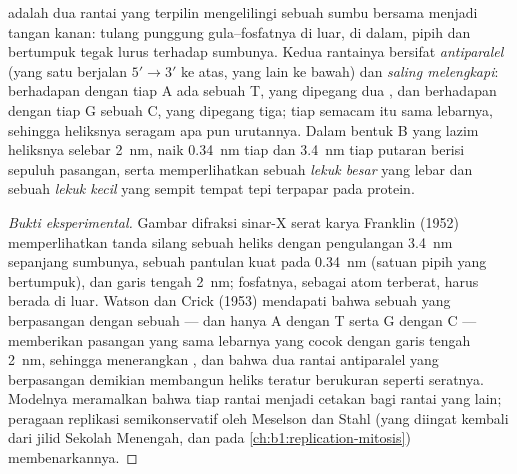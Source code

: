 \begin{theorem}\label{thm:b1:nucleic-acids:helix}
 adalah dua rantai  yang terpilin mengelilingi sebuah
sumbu bersama menjadi \emph{} tangan kanan: tulang punggung
gula--fosfatnya di luar,  di dalam, pipih dan bertumpuk tegak
lurus terhadap sumbunya. Kedua rantainya bersifat \emph{antiparalel}
(yang satu berjalan $5' \to 3'$ ke atas, yang lain ke bawah) dan
\emph{saling melengkapi}: berhadapan dengan tiap A ada sebuah T, yang
dipegang dua , dan berhadapan dengan tiap G sebuah C,
yang dipegang tiga; tiap \emph{} semacam itu sama lebarnya,
sehingga heliksnya seragam apa pun urutannya. Dalam bentuk B yang lazim
heliksnya selebar \qty{2}{nm}, naik \qty{0.34}{nm} tiap 
dan \qty{3.4}{nm} tiap putaran berisi sepuluh pasangan, serta
memperlihatkan sebuah \emph{lekuk besar} yang lebar dan sebuah
\emph{lekuk kecil} yang sempit tempat tepi  terpapar pada
protein.
\end{theorem}
\begin{proof}[Bukti eksperimental]
Gambar difraksi sinar-X serat  karya Franklin (1952) memperlihatkan
tanda silang sebuah heliks dengan pengulangan \qty{3.4}{nm} sepanjang
sumbunya, sebuah pantulan kuat pada \qty{0.34}{nm} (satuan pipih yang
bertumpuk), dan garis tengah \qty{2}{nm}; fosfatnya, sebagai atom
terberat, harus berada di luar. Watson dan Crick (1953) mendapati bahwa
sebuah  yang berpasangan dengan sebuah  --- dan hanya A
dengan T serta G dengan C --- memberikan pasangan yang sama lebarnya
yang cocok dengan garis tengah \qty{2}{nm}, sehingga menerangkan , dan bahwa dua rantai antiparalel yang berpasangan demikian
membangun heliks teratur berukuran seperti seratnya. Modelnya
meramalkan bahwa tiap rantai menjadi cetakan bagi rantai yang lain;
peragaan replikasi semikonservatif oleh Meselson dan Stahl (yang
diingat kembali dari jilid Sekolah Menengah, dan pada
\cref{ch:b1:replication-mitosis}) membenarkannya.
\end{proof}

